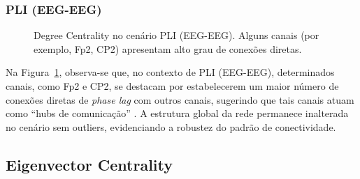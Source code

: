 \subsubsection{PLI (EEG-EEG)}
\begin{figure}[htb]
    \centering
    \quad
    \caption{Degree Centrality no cenário PLI (EEG-EEG). Alguns canais (por exemplo, Fp2, CP2) apresentam alto grau de conexões diretas.}
    \label{fig:dc_pli_eegeeg}
\end{figure}

Na Figura~\ref{fig:dc_pli_eegeeg}, observa-se que, no contexto de PLI (EEG-EEG), determinados canais, como Fp2 e CP2, se destacam por estabelecerem um maior número de conexões diretas de \emph{phase lag} com outros canais, sugerindo que tais canais atuam como “hubs de comunicação” \cite{newman2010networks}. A estrutura global da rede permanece inalterada no cenário sem outliers, evidenciando a robustez do padrão de conectividade.



\subsection{Eigenvector Centrality}

